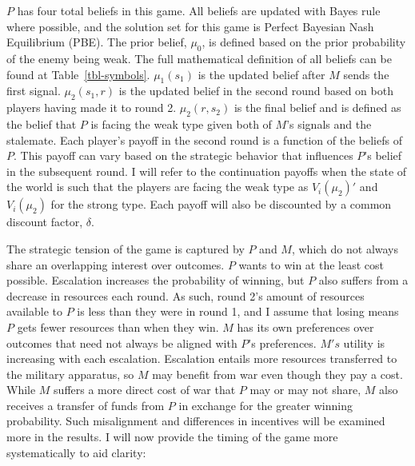 \documentclass[
  12pt,
]{article}
\theoremstyle{plain}
\theoremstyle{plain}
\theoremstyle{remark}
\begin{document}
\(P\) has four total beliefs in this game. All beliefs are updated with
Bayes rule where possible, and the solution set for this game is Perfect
Bayesian Nash Equilibrium (PBE). The prior belief, \(\mu_0\), is defined
based on the prior probability of the enemy being weak. The full
mathematical definition of all beliefs can be found at
Table~\ref{tbl-symbols}. \(\mu_1(s_1)\) is the updated belief after
\(M\) sends the first signal. \(\mu_2(s_1, r)\) is the updated belief in
the second round based on both players having made it to round 2.
\(\mu_2(r, s_2)\) is the final belief and is defined as the belief that
\(P\) is facing the weak type given both of \(M\)'s signals and the
stalemate. Each player's payoff in the second round is a function of the
beliefs of \(P\). This payoff can vary based on the strategic behavior
that influences \(P\)'s belief in the subsequent round. I will refer to
the continuation payoffs when the state of the world is such that the
players are facing the weak type as \(V_i(\mu_2)'\) and \(V_i(\mu_2)\)
for the strong type. Each payoff will also be discounted by a common
discount factor, \(\delta\).

The strategic tension of the game is captured by \(P\) and \(M\), which
do not always share an overlapping interest over outcomes. \(P\) wants
to win at the least cost possible. Escalation increases the probability
of winning, but \(P\) also suffers from a decrease in resources each
round. As such, round 2's amount of resources available to \(P\) is less
than they were in round 1, and I assume that losing means \(P\) gets
fewer resources than when they win. \(M\) has its own preferences over
outcomes that need not always be aligned with \(P\)'s preferences.
\(M's\) utility is increasing with each escalation. Escalation entails
more resources transferred to the military apparatus, so \(M\) may
benefit from war even though they pay a cost. While \(M\) suffers a more
direct cost of war that \(P\) may or may not share, \(M\) also receives
a transfer of funds from \(P\) in exchange for the greater winning
probability. Such misalignment and differences in incentives will be
examined more in the results. I will now provide the timing of the game
more systematically to aid clarity:
\end{document}
